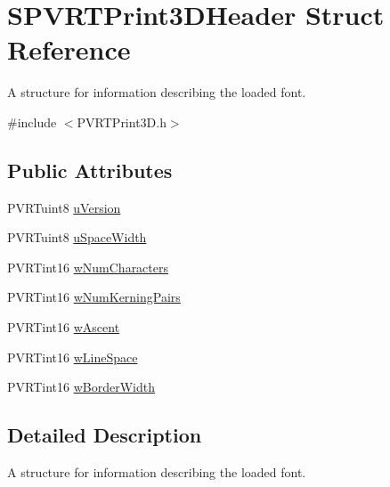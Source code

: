 \hypertarget{struct_s_p_v_r_t_print3_d_header}{\section{S\+P\+V\+R\+T\+Print3\+D\+Header Struct Reference}
\label{struct_s_p_v_r_t_print3_d_header}
}


A structure for information describing the loaded font.  




{\ttfamily \#include $<$P\+V\+R\+T\+Print3\+D.\+h$>$}

\subsection*{Public Attributes}
\begin{DoxyCompactItemize}
\item 
P\+V\+R\+Tuint8 \hyperlink{struct_s_p_v_r_t_print3_d_header_abe62bc6b204189b0d466536be5271647}{u\+Version}
\item 
P\+V\+R\+Tuint8 \hyperlink{struct_s_p_v_r_t_print3_d_header_ac2f5f0e83a1563271101fb9b87734458}{u\+Space\+Width}
\item 
P\+V\+R\+Tint16 \hyperlink{struct_s_p_v_r_t_print3_d_header_a8e4123571e66b27d66ed852373e75a11}{w\+Num\+Characters}
\item 
P\+V\+R\+Tint16 \hyperlink{struct_s_p_v_r_t_print3_d_header_a4c0f72a85cd20c6d34eb538b0aef216d}{w\+Num\+Kerning\+Pairs}
\item 
P\+V\+R\+Tint16 \hyperlink{struct_s_p_v_r_t_print3_d_header_a7abe89f6314f93f74e5e355ccb312fe0}{w\+Ascent}
\item 
P\+V\+R\+Tint16 \hyperlink{struct_s_p_v_r_t_print3_d_header_adcf87f045d50c3672aedb6097fe2b420}{w\+Line\+Space}
\item 
P\+V\+R\+Tint16 \hyperlink{struct_s_p_v_r_t_print3_d_header_aa3041948eabe110e0d5c15678f4d35ca}{w\+Border\+Width}
\end{DoxyCompactItemize}


\subsection{Detailed Description}
A structure for information describing the loaded font. 



 

